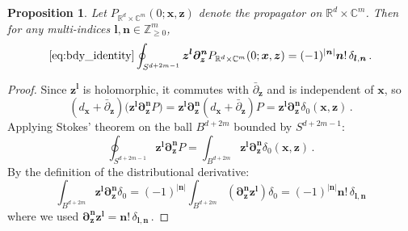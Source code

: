 \documentclass[11pt]{article}
\newcommand{\C}{\mathbb{C}}
\newcommand{\R}{\mathbb{R}}
\newcommand{\Z}{\mathbb{Z}}
\numberwithin{equation}{section}
\newtheorem{prop}{Proposition}[section]
\begin{document}
\begin{prop}\label{prop:bdy_sphere}
Let $P_{\R^d\times \C^{m}}(0;\boldsymbol{x},\boldsymbol{z})$ denote the propagator on $\R^d\times \C^m$. Then for any multi-indices $\boldsymbol{l},\boldsymbol{n} \in \Z_{\geq 0}^m$,
\begin{equation}\ref{eq:bdy_identity}
	\oint_{S^{d+2m-1}}\boldsymbol{z}^{\boldsymbol{l}} \boldsymbol{\partial}_{\boldsymbol{z}}^{\boldsymbol{n}} P_{\R^d\times \C^{m}}(0;\boldsymbol{x},\boldsymbol{z}) = (-1)^{|\boldsymbol{n}|}\boldsymbol{n}!\,\delta_{\boldsymbol{l},\boldsymbol{n}}\,.
\end{equation}
\end{prop}

\begin{proof}
Since $\boldsymbol{z}^{\boldsymbol{l}}$ is holomorphic, it commutes with $\bar{\partial}_{\boldsymbol{z}}$ and is independent of $\boldsymbol{x}$, so
\begin{equation}
	(d_{\boldsymbol{x}} + \bar{\partial}_{\boldsymbol{z}})\big(\boldsymbol{z}^{\boldsymbol{l}} \boldsymbol{\partial}_{\boldsymbol{z}}^{\boldsymbol{n}} P\big) = \boldsymbol{z}^{\boldsymbol{l}} \boldsymbol{\partial}_{\boldsymbol{z}}^{\boldsymbol{n}} (d_{\boldsymbol{x}} + \bar{\partial}_{\boldsymbol{z}})P = \boldsymbol{z}^{\boldsymbol{l}} \boldsymbol{\partial}_{\boldsymbol{z}}^{\boldsymbol{n}} \delta_0(\boldsymbol{x},\boldsymbol{z})\,.
\end{equation}
Applying Stokes' theorem on the ball $B^{d+2m}$ bounded by $S^{d+2m-1}$:
\begin{equation}
	\oint_{S^{d+2m-1}} \boldsymbol{z}^{\boldsymbol{l}} \boldsymbol{\partial}_{\boldsymbol{z}}^{\boldsymbol{n}} P = \int_{B^{d+2m}} \boldsymbol{z}^{\boldsymbol{l}} \boldsymbol{\partial}_{\boldsymbol{z}}^{\boldsymbol{n}} \delta_0(\boldsymbol{x},\boldsymbol{z})\,.
\end{equation}
By the definition of the distributional derivative:
\begin{equation}
	\int_{B^{d+2m}} \boldsymbol{z}^{\boldsymbol{l}} \boldsymbol{\partial}_{\boldsymbol{z}}^{\boldsymbol{n}} \delta_0 = (-1)^{|\boldsymbol{n}|}\int_{B^{d+2m}} (\boldsymbol{\partial}_{\boldsymbol{z}}^{\boldsymbol{n}} \boldsymbol{z}^{\boldsymbol{l}}) \delta_0 = (-1)^{|\boldsymbol{n}|} \boldsymbol{n}!\,\delta_{\boldsymbol{l},\boldsymbol{n}}
\end{equation}
where we used $\boldsymbol{\partial}_{\boldsymbol{z}}^{\boldsymbol{n}} \boldsymbol{z}^{\boldsymbol{l}} = \boldsymbol{n}!\,\delta_{\boldsymbol{l},\boldsymbol{n}}$\,.
\end{proof}
\end{document}
